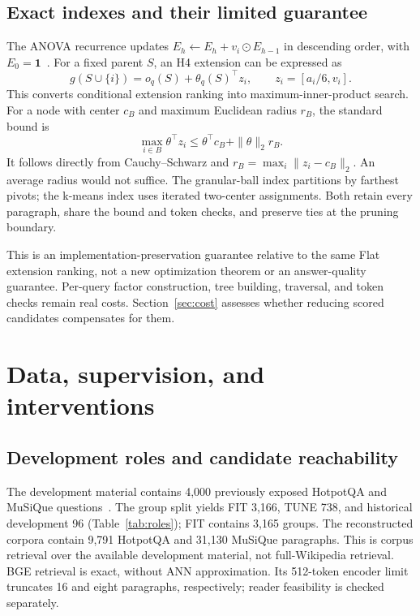 \documentclass[preprint,12pt]{elsarticle}
\begin{document}
\subsection{Exact indexes and their limited guarantee}
The ANOVA recurrence updates $E_h\leftarrow E_h+v_i\odot E_{h-1}$ in descending order, with $E_0=\mathbf1$~\cite{blondel2016hofm}. For a fixed parent $S$, an H4 extension can be expressed as
\begin{equation}
g(S\cup\{i\})=o_q(S)+\theta_q(S)^\top z_i,
\qquad z_i=[a_i/6,v_i].
\end{equation}
This converts conditional extension ranking into maximum-inner-product search. For a node with center $c_B$ and maximum Euclidean radius $r_B$, the standard bound is
\begin{equation}\label{eq:bound}
\max_{i\in B}\theta^\top z_i\leq\theta^\top c_B+\|\theta\|_2r_B.
\end{equation}
It follows directly from Cauchy--Schwarz and $r_B=\max_i\|z_i-c_B\|_2$. An average radius would not suffice. The granular-ball index partitions by farthest pivots; the k-means index uses iterated two-center assignments. Both retain every paragraph, share the bound and token checks, and preserve ties at the pruning boundary.

This is an implementation-preservation guarantee relative to the same Flat extension ranking, not a new optimization theorem or an answer-quality guarantee. Per-query factor construction, tree building, traversal, and token checks remain real costs. Section~\ref{sec:cost} assesses whether reducing scored candidates compensates for them.

\section{Data, supervision, and interventions}\label{sec:data}
\subsection{Development roles and candidate reachability}
The development material contains 4,000 previously exposed HotpotQA and MuSiQue questions~\cite{yang2018hotpotqa,trivedi2022musique}. The group split yields FIT 3,166, TUNE 738, and historical development 96 (Table~\ref{tab:roles}); FIT contains 3,165 groups. The reconstructed corpora contain 9,791 HotpotQA and 31,130 MuSiQue paragraphs. This is corpus retrieval over the available development material, not full-Wikipedia retrieval. BGE retrieval is exact, without ANN approximation. Its 512-token encoder limit truncates 16 and eight paragraphs, respectively; reader feasibility is checked separately.
\end{document}
